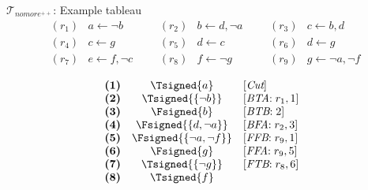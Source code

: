 \begin{frame}{$\mathcal{T}_{\textit{nomore}^{++}}$: Example tableau}
\small
\[
\begin{array}{llllllllllll}
(r_1)  &  a \leftarrow \neg b                  & & &
(r_2)  &  b \leftarrow d, \neg a               & & &
(r_3)  &  c \leftarrow b, d                            \\
(r_4)  &  c \leftarrow g                               & & &
(r_5)  &  d \leftarrow c                               & & &
(r_6)  &  d \leftarrow g                               \\
(r_7)  &  e \leftarrow f, \neg c               & & &
(r_8)  &  f \leftarrow \neg g                  & & &
(r_9)  &  g \leftarrow \neg a, \neg f
\end{array}
\]
\begin{center}
\hspace*{-15pt}
\begin{minipage}[t]{16cm}
\tiny
\begin{minipage}[t]{4.5cm}
\[
\hspace{-0.2cm}
\begin{array}{lcl}
\textbf{(1)}                                       &
  \Tsigned{a}                                      &
  [\textit{Cut}]                                   \\
\textbf{(2)}                                       &
  \Tsigned{\{\neg b\}}                     &
  [\textit{BTA}{:}\; r_1, \text{1}]                \\
\textbf{(3)}                                       &
  \Fsigned{b}                                      &
  [\textit{BTB}{:}\; \text{2}]                     \\
\textbf{(4)}                                       &
  \Fsigned{\{d,\neg a\}}                   &
  [\textit{BFA}{:}\;r_2, \text{3}]                 \\
\textbf{(5)}                                       &
  \Fsigned{\{\neg a,\neg f\}}      &
  [\textit{FFB}{:}\;r_9, \text{1}]                 \\
\textbf{(6)}                                       &
  \Fsigned{g}                                      &
  [\textit{FFA}{:}\;r_9, \text{5}]                 \\
\textbf{(7)}                                       &
  \Tsigned{\{\neg g\}}                     &
  [\textit{FTB}{:}\;r_8, \text{6}]                 \\
\textbf{(8)}                                       &
  \Tsigned{f}                                      &

\end{array}\]
\end{minipage}
\end{minipage}
\end{center}
\end{frame}
